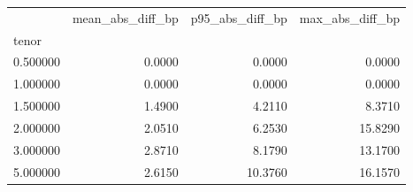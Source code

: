 \begin{tabular}{lrrr}
\toprule
 & mean\_abs\_diff\_bp & p95\_abs\_diff\_bp & max\_abs\_diff\_bp \\
tenor &  &  &  \\
\midrule
0.500000 & 0.0000 & 0.0000 & 0.0000 \\
1.000000 & 0.0000 & 0.0000 & 0.0000 \\
1.500000 & 1.4900 & 4.2110 & 8.3710 \\
2.000000 & 2.0510 & 6.2530 & 15.8290 \\
3.000000 & 2.8710 & 8.1790 & 13.1700 \\
5.000000 & 2.6150 & 10.3760 & 16.1570 \\
\bottomrule
\end{tabular}
